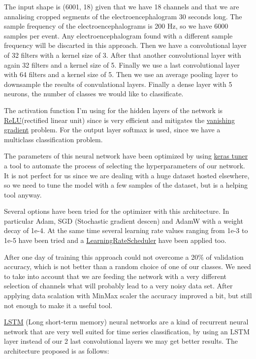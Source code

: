 The input shape is (6001, 18) given that we have 18 channels and that we are annalising cropped segments of the electroencephalogram 30 seconds long. The sample frequency of the electroencephalograms is 200 Hz, so we have 6000 samples per event. Any electroencephalogram found with a different sample frequency will be discarted in this approach. Then we have a convolutional layer of 32 filters with a kernel size of 3. After that another convolutional layer with again 32 filters and a kernel size of 5. Finally we use a last convolutional layer with 64 filters and a kernel size of 5. Then we use an average pooling layer to downsample the results of convulational layers. Finally a dense layer with 5 neurons, the number of classes we would like to classificate.

The activation function I'm using for the hidden layers of the network is \href{https://en.wikipedia.org/wiki/Rectifier_(neural_networks)}{ReLU}(rectified linear unit) since is very efficient and mitigates the \href{https://en.wikipedia.org/wiki/Vanishing_gradient_problem}{vanishing gradient} problem. For the output layer softmax is used, since we have a multiclass classification problem.

The parameters of this neural network have been optimized by using \href{https://keras.io/keras_tuner/}{keras tuner} a tool to automate the process of selecting the hyperparameters of our network. It is not perfect for us since we are dealing with a huge dataset hosted elsewhere, so we need to tune the model with a few samples of the dataset, but is a helping tool anyway.

Several options have been tried for the optimizer with this architecture. In particular Adam, SGD (Stochastic gradient descen) and AdamW with a weight decay of 1e-4. At the same time several learning rate values ranging from 1e-3 to 1e-5 have been tried and a \href{https://keras.io/api/callbacks/learning_rate_scheduler/}{LearningRateScheduler} have been applied too.

After one day of training this approach could not overcome a 20\% of validation accuracy, which is not better than a random choice of one of our classes. We need to take into account that we are feeding the network with a very different selection of channels what will probably lead to a very noisy data set. After applying data scalation with MinMax scaler the accuracy improved a bit, but still not enough to make it a useful tool.

\href{https://en.wikipedia.org/wiki/Long_short-term_memory}{LSTM} (Long short-term memory) neural networks are a kind of recurrent neural network that are very well suited for time series classification, by using an LSTM layer instead of our 2 last convolutional layers we may get better results. The architecture proposed is as follows:

